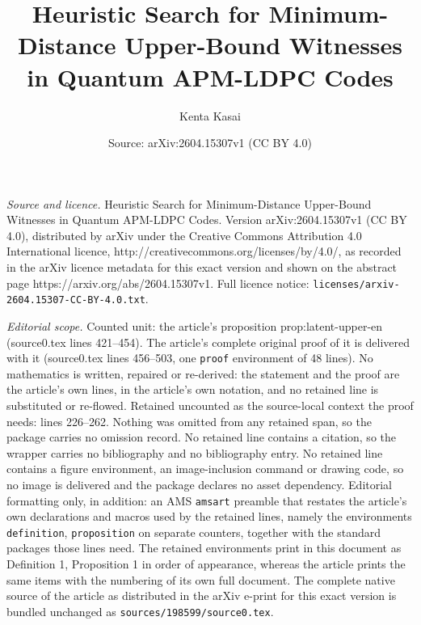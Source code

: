 \documentclass[10pt,a4paper]{amsart}
\title{Heuristic Search for Minimum-Distance Upper-Bound Witnesses in Quantum APM-LDPC Codes}
\author{Kenta Kasai}
\date{Source: arXiv:2604.15307v1 (CC BY 4.0)}
\begin{document}
\maketitle

\noindent\emph{Source and licence.} Heuristic Search for Minimum-Distance Upper-Bound Witnesses in Quantum APM-LDPC Codes. Version arXiv:2604.15307v1 (CC BY 4.0), distributed by arXiv under the Creative Commons Attribution 4.0 International licence, http://creativecommons.org/licenses/by/4.0/, as recorded in the arXiv licence metadata for this exact version and shown on the abstract page https://arxiv.org/abs/2604.15307v1. Full licence notice: \texttt{licenses/arxiv-2604.15307-CC-BY-4.0.txt}.\par\smallskip

\noindent\textit{Editorial scope.} Counted unit: the article's proposition prop:latent-upper-en (source0.tex lines 421--454). The article's complete original proof of it is delivered with it (source0.tex lines 456--503, one \texttt{proof} environment of 48 lines). No mathematics is written, repaired or re-derived: the statement and the proof are the article's own lines, in the article's own notation, and no retained line is substituted or re-flowed.  Retained uncounted as the source-local context the proof needs: lines 226--262.  Nothing was omitted from any retained span, so the package carries no omission record.  No retained line contains a citation, so the wrapper carries no bibliography and no bibliography entry.  No retained line contains a figure environment, an image-inclusion command or drawing code, so no image is delivered and the package declares no asset dependency.  Editorial formatting only, in addition: an AMS \texttt{amsart} preamble that restates the article's own declarations and macros used by the retained lines, namely the environments \texttt{definition}, \texttt{proposition} on separate counters, together with the standard packages those lines need.  The retained environments print in this document as Definition 1, Proposition 1 in order of appearance, whereas the article prints the same items with the numbering of its own full document.  The complete native source of the article as distributed in the arXiv e-print for this exact version is bundled unchanged as \texttt{sources/198599/source0.tex}.
\end{document}
